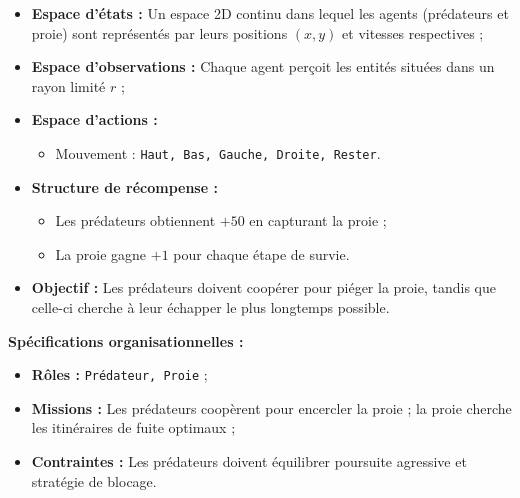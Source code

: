 \begin{itemize}
    \item \textbf{Espace d'états :} Un espace 2D continu dans lequel les agents (prédateurs et proie) sont représentés par leurs positions $(x, y)$ et vitesses respectives ;
    \item \textbf{Espace d'observations :} Chaque agent perçoit les entités situées dans un rayon limité $r$ ;
    \item \textbf{Espace d'actions :}
          \begin{itemize}
              \item Mouvement : \texttt{Haut, Bas, Gauche, Droite, Rester}.
          \end{itemize}
    \item \textbf{Structure de récompense :}
          \begin{itemize}
              \item Les prédateurs obtiennent $+50$ en capturant la proie ;
              \item La proie gagne $+1$ pour chaque étape de survie.
          \end{itemize}
    \item \textbf{Objectif :} Les prédateurs doivent coopérer pour piéger la proie, tandis que celle-ci cherche à leur échapper le plus longtemps possible.
\end{itemize}

\textbf{Spécifications organisationnelles :}
\begin{itemize}
    \item \textbf{Rôles :} \texttt{Prédateur, Proie} ;
    \item \textbf{Missions :} Les prédateurs coopèrent pour encercler la proie ; la proie cherche les itinéraires de fuite optimaux ;
    \item \textbf{Contraintes :} Les prédateurs doivent équilibrer poursuite agressive et stratégie de blocage.
\end{itemize}

